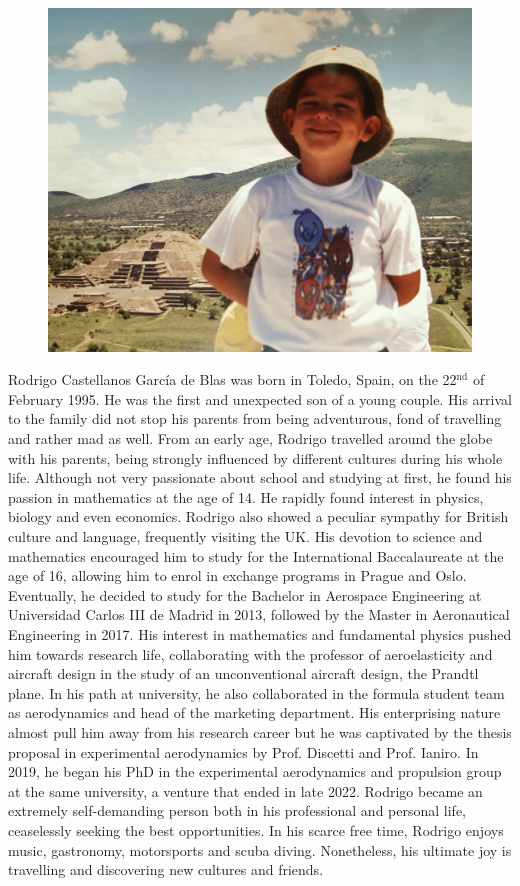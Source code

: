 \begin{bio}

\begin{figure}
\includegraphics[width=0.96\linewidth]{header/rodri-min.jpg} 
\end{figure}
Rodrigo Castellanos García de Blas was born in Toledo, Spain, on the 22$^\text{nd}$ of February 1995. He was the first and unexpected son of a young couple. His arrival to the family did not stop his parents from being adventurous, fond of travelling and rather mad as well. From an early age, Rodrigo travelled around the globe with his parents, being strongly influenced by different cultures during his whole life. Although not very passionate about school and studying at first, he found his passion in mathematics at the age of 14. He rapidly found interest in physics, biology and even economics. Rodrigo also showed a peculiar sympathy for British culture and language, frequently visiting the UK. His devotion to science and mathematics encouraged him to study for the International Baccalaureate at the age of 16, allowing him to enrol in exchange programs in Prague and Oslo. Eventually, he decided to study for the Bachelor in Aerospace Engineering at Universidad Carlos III de Madrid in 2013, followed by the Master in Aeronautical Engineering in 2017. His interest in mathematics and fundamental physics pushed him towards research life, collaborating with the professor of aeroelasticity and aircraft design in the study of an unconventional aircraft design, the Prandtl plane. In his path at university, he also collaborated in the formula student team as aerodynamics and head of the marketing department. His enterprising nature almost pull him away from his research career but he was captivated by the thesis proposal in experimental aerodynamics by Prof. Discetti and Prof. Ianiro. In 2019, he began his PhD in the experimental aerodynamics and propulsion group at the same university, a venture that ended in late 2022. Rodrigo became an extremely self-demanding person both in his professional and personal life, ceaselessly seeking the best opportunities. In his scarce free time, Rodrigo enjoys music, gastronomy, motorsports and scuba diving. Nonetheless, his ultimate joy is travelling and discovering new cultures and friends.
\end{bio}